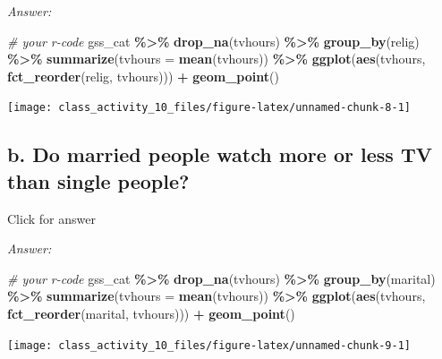 \documentclass[
]{book}
\newenvironment{Shaded}{\begin{snugshade}}{\end{snugshade}}
\newcommand{\AttributeTok}[1]{\textcolor[rgb]{0.13,0.29,0.53}{#1}}
\newcommand{\CommentTok}[1]{\textcolor[rgb]{0.56,0.35,0.01}{\textit{#1}}}
\newcommand{\FunctionTok}[1]{\textcolor[rgb]{0.13,0.29,0.53}{\textbf{#1}}}
\newcommand{\NormalTok}[1]{#1}
\newcommand{\SpecialCharTok}[1]{\textcolor[rgb]{0.81,0.36,0.00}{\textbf{#1}}}
\begin{document}
\emph{Answer:}

\begin{Shaded}
\begin{Highlighting}[]
\CommentTok{\# your r{-}code}
\NormalTok{gss\_cat }\SpecialCharTok{\%\textgreater{}\%}
  \FunctionTok{drop\_na}\NormalTok{(tvhours) }\SpecialCharTok{\%\textgreater{}\%}
  \FunctionTok{group\_by}\NormalTok{(relig) }\SpecialCharTok{\%\textgreater{}\%}
  \FunctionTok{summarize}\NormalTok{(}\AttributeTok{tvhours =} \FunctionTok{mean}\NormalTok{(tvhours)) }\SpecialCharTok{\%\textgreater{}\%}
  \FunctionTok{ggplot}\NormalTok{(}\FunctionTok{aes}\NormalTok{(tvhours, }\FunctionTok{fct\_reorder}\NormalTok{(relig, tvhours))) }\SpecialCharTok{+}
    \FunctionTok{geom\_point}\NormalTok{()}
\end{Highlighting}
\end{Shaded}

\texttt{[image: class\_activity\_10\_files/figure-latex/unnamed-chunk-8-1]}

\hypertarget{b.-do-married-people-watch-more-or-less-tv-than-single-people}{%
\subsection{b. Do married people watch more or less TV than single people?}\label{b.-do-married-people-watch-more-or-less-tv-than-single-people}}

Click for answer

\emph{Answer:}

\begin{Shaded}
\begin{Highlighting}[]
\CommentTok{\# your r{-}code}
\NormalTok{gss\_cat }\SpecialCharTok{\%\textgreater{}\%}
  \FunctionTok{drop\_na}\NormalTok{(tvhours) }\SpecialCharTok{\%\textgreater{}\%}
  \FunctionTok{group\_by}\NormalTok{(marital) }\SpecialCharTok{\%\textgreater{}\%}
  \FunctionTok{summarize}\NormalTok{(}\AttributeTok{tvhours =} \FunctionTok{mean}\NormalTok{(tvhours)) }\SpecialCharTok{\%\textgreater{}\%}
  \FunctionTok{ggplot}\NormalTok{(}\FunctionTok{aes}\NormalTok{(tvhours, }\FunctionTok{fct\_reorder}\NormalTok{(marital, tvhours))) }\SpecialCharTok{+}
    \FunctionTok{geom\_point}\NormalTok{()}
\end{Highlighting}
\end{Shaded}

\texttt{[image: class\_activity\_10\_files/figure-latex/unnamed-chunk-9-1]}
\end{document}

